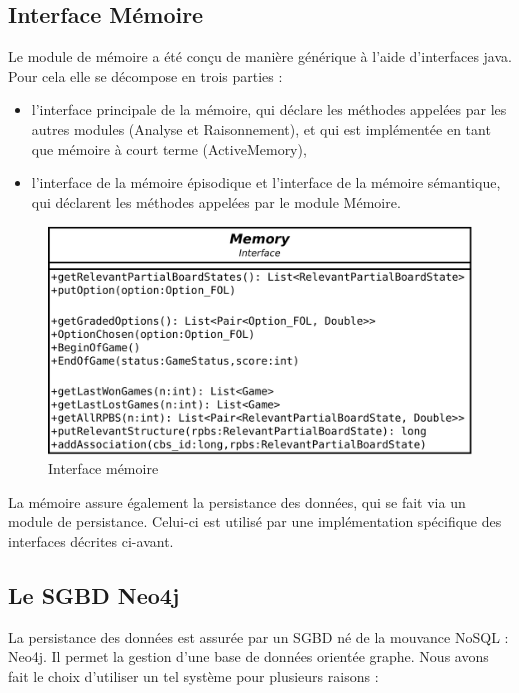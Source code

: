\subsection{Interface Mémoire}

Le module de mémoire a été conçu de manière générique à l'aide d'interfaces java. Pour cela elle se décompose en trois parties :

\begin{itemize}
\item l'interface principale de la mémoire, qui déclare les méthodes appelées par les autres modules (Analyse et Raisonnement), et qui est implémentée en tant que mémoire à court terme (ActiveMemory),

\item l'interface de la mémoire épisodique et l'interface de la mémoire sémantique, qui déclarent les méthodes appelées par le module Mémoire.
\end{itemize}

\begin{figure}[H]
\includegraphics[width=\textwidth]{files/memoire/interface}
\caption{Interface mémoire}
\end{figure}

La mémoire assure également la persistance des données, qui se fait via un module de persistance. Celui-ci est utilisé par une implémentation spécifique des interfaces décrites ci-avant.

\subsection{Le \gls{SGBD} Neo4j}

La persistance des données est assurée par un \gls{SGBD} né de la mouvance \gls{NoSQL} : Neo4j. Il permet la gestion d'une base de données orientée graphe. Nous avons fait le choix d'utiliser un tel système pour plusieurs raisons :

